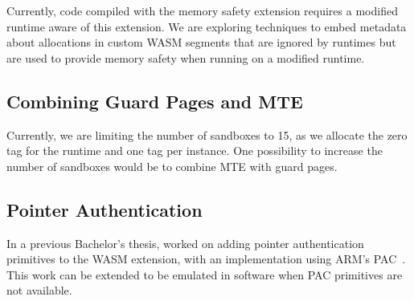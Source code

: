 Currently, code compiled with the memory safety extension requires a modified runtime aware of this extension.
We are exploring techniques to embed metadata about allocations in custom \ac{WASM} segments that are ignored by runtimes but are used to provide memory safety when running on a modified runtime.

\subsection{Combining Guard Pages and \ac{MTE}}
\label{subsec:combining-guard-pages-and-mte}

Currently, we are limiting the number of sandboxes to 15, as we allocate the zero tag for the runtime and one tag per instance.
One possibility to increase the number of sandboxes would be to combine \ac{MTE} with guard pages.

\subsection{Pointer Authentication}
\label{subsec:future-work-pac}

In a previous Bachelor's thesis, \citeauthor{rehde2023wasm} worked on adding pointer authentication primitives to the \ac{WASM} extension, with an implementation using ARM's \ac{PAC}~\cite{rehde2023wasm}.
This work can be extended to be emulated in software when \ac{PAC} primitives are not available.

